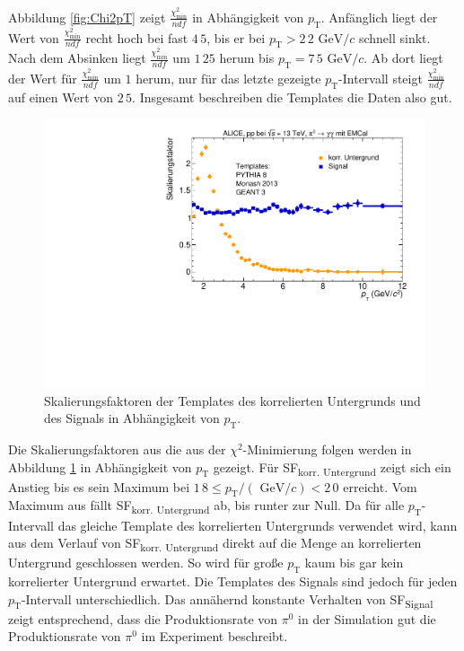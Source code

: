 \newline
Abbildung \ref{fig:Chi2pT} zeigt $\frac{\chi^{2}_\text{min}}{ndf}$ in Ab\-hän\-gig\-keit von $p_{\text{T}}$.
Anfänglich liegt der Wert von $\frac{\chi^{2}_\text{min}}{ndf}$ recht hoch bei fast $4\,5$, bis er bei $p_{\text{T}} >2\,2 \text{ GeV}/c$ schnell sinkt.  
Nach dem Absinken liegt $\frac{\chi^{2}_\text{min}}{ndf}$ um $1\,25$ herum bis $p_{\text{T}} = 7\,5\text{ GeV}/c$.
Ab dort liegt der Wert für $\frac{\chi^{2}_\text{min}}{ndf}$ um $1$ herum, nur für das letzte gezeigte $p_{\text{T}}$-Intervall steigt $\frac{\chi^{2}_\text{min}}{ndf}$ auf einen Wert von $2\,5$.
Insgesamt beschreiben die Templates die Daten also gut.
\begin{figure}[t!]
\centering
\includegraphics[width=.65\linewidth]{SF_Data_2016.pdf}
\caption{Skalierungsfaktoren der Templates des korrelierten Untergrunds und des Signals in Abhängigkeit von $p_{\text{T}}$.
}
\label{fig:SF}
\end{figure}
\newline
Die Skalierungsfaktoren aus die aus der $\chi^{2}$-Minimierung folgen werden in Abbildung \ref{fig:SF} in Ab\-hän\-gig\-keit von $p_\text{T}$ gezeigt.
Für SF\textsubscript{korr. Untergrund} zeigt sich ein Anstieg bis es sein Maximum bei $1\,8 \leq p_{\text{T}}/(\text{ GeV}/c) < 2\,0$ erreicht.
Vom Maximum aus fällt SF\textsubscript{korr. Untergrund} ab, bis runter zur Null.
Da für alle $p_{\text{T}}$-Intervall das gleiche Template des korrelierten Untergrunds verwendet wird, kann aus dem Verlauf von SF\textsubscript{korr. Untergrund} direkt auf die Menge an korrelierten Untergrund geschlossen werden.
So wird für große $p_{\text{T}}$ kaum bis gar kein korrelierter Untergrund erwartet.
\newline
Die Templates des Signals sind jedoch für jeden $p_{\text{T}}$-Intervall unterschiedlich.
Das annähernd konstante Verhalten von SF\textsubscript{Signal} zeigt entsprechend, dass die Produktionsrate von $\pi^{0}$ in der Simulation gut die Produktionsrate von $\pi^{0}$ im Experiment beschreibt.